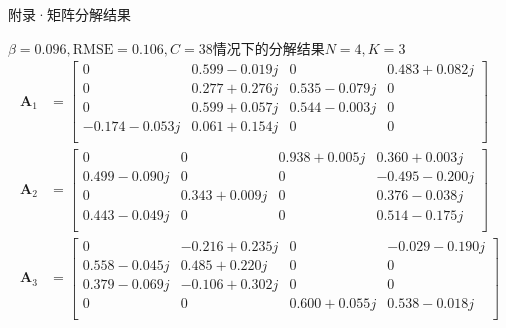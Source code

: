 \documentclass[11pt]{article}
\begin{document}
\begin{section}{附录·矩阵分解结果}
 \begin{center}
   $\beta=0.096,\mathrm{RMSE}=0.106,C=38$情况下的分解结果$N=4,K=3$
   \begin{align*}
     \mathbf{A}_1 & =\left[
       \begin{matrix}
         0             & 0.599-0.019j & 0            & 0.483+0.082j \\
         0             & 0.277+0.276j & 0.535-0.079j & 0            \\
         0             & 0.599+0.057j & 0.544-0.003j & 0            \\
         -0.174-0.053j & 0.061+0.154j & 0            & 0            \\
       \end{matrix}
     \right]                \\
     \mathbf{A}_2 & =\left[
       \begin{matrix}
         0            & 0            & 0.938+0.005j & 0.360+0.003j  \\
         0.499-0.090j & 0            & 0            & -0.495-0.200j \\
         0            & 0.343+0.009j & 0            & 0.376-0.038j  \\
         0.443-0.049j & 0            & 0            & 0.514-0.175j  \\
       \end{matrix}
     \right]                \\
     \mathbf{A}_3 & =\left[
       \begin{matrix}
         0            & -0.216+0.235j & 0            & -0.029-0.190j \\
         0.558-0.045j & 0.485+0.220j  & 0            & 0             \\
         0.379-0.069j & -0.106+0.302j & 0            & 0             \\
         0            & 0             & 0.600+0.055j & 0.538-0.018j  \\
       \end{matrix}
       \right]
   \end{align*}
 \end{center}

\end{section}
\end{document}
